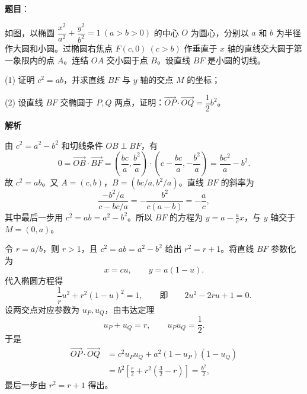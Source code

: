 \begin{answer}

\textbf{题目}：

如图，以椭圆 \(\dfrac{x^2}{a^2}+\dfrac{y^2}{b^2}=1\ (a>b>0)\) 的中心 \(O\) 为圆心，分别以 \(a\) 和 \(b\) 为半径作大圆和小圆。过椭圆右焦点 \(F(c,0)\ (c>b)\) 作垂直于 \(x\) 轴的直线交大圆于第一象限内的点 \(A\)。连结 \(OA\) 交小圆于点 \(B\)。设直线 \(BF\) 是小圆的切线。

(1) 证明 \(c^2=ab\)，并求直线 \(BF\) 与 \(y\) 轴的交点 \(M\) 的坐标；

(2) 设直线 \(BF\) 交椭圆于 \(P,Q\) 两点，证明：\(\overrightarrow{OP}\cdot\overrightarrow{OQ}=\dfrac12b^2\)。
\nopagebreak[4]
\begin{center}\end{center}
\nopagebreak[4]
\textbf{解析}


由 \(c^2=a^2-b^2\) 和切线条件 \(OB\perp BF\)，有
\nopagebreak[4]
\[
0=\overrightarrow{OB}\cdot\overrightarrow{BF}
=\left(\frac{bc}{a},\frac{b^2}{a}\right)\cdot
\left(c-\frac{bc}{a},-\frac{b^2}{a}\right)
=\frac{bc^2}{a}-b^2.
\]
故 \(c^2=ab\)。又 \(A=(c,b)\)，\(B=(bc/a,b^2/a)\)。直线 \(BF\) 的斜率为
\nopagebreak[4]
\[
\frac{-b^2/a}{c-bc/a}=-\frac{b^2}{c(a-b)}=-\frac ac,
\]
其中最后一步用 \(c^2=ab=a^2-b^2\)。所以 \(BF\) 的方程为 \(y=a-\frac acx\)，与 \(y\) 轴交于 \(M=(0,a)\)。


令 \(r=a/b\)，则 \(r>1\)，且 \(c^2=ab=a^2-b^2\) 给出 \(r^2=r+1\)。将直线 \(BF\) 参数化为
\nopagebreak[4]
\[
x=cu,\qquad y=a(1-u).
\]
代入椭圆方程得
\nopagebreak[4]
\[
\frac1r u^2+r^2(1-u)^2=1,
\qquad\text{即}\qquad 2u^2-2ru+1=0.
\]
设两交点对应参数为 \(u_P,u_Q\)，由韦达定理
\nopagebreak[4]
\[
u_P+u_Q=r,\qquad u_Pu_Q=\frac12.
\]
于是
\nopagebreak[4]
\[
\begin{aligned}
\overrightarrow{OP}\cdot\overrightarrow{OQ}
&=c^2u_Pu_Q+a^2(1-u_P)(1-u_Q)\\
&=b^2\left[\frac r2+r^2\left(\frac32-r\right)\right]
=\frac{b^2}{2},
\end{aligned}
\]
最后一步由 \(r^2=r+1\) 得出。



\end{answer}